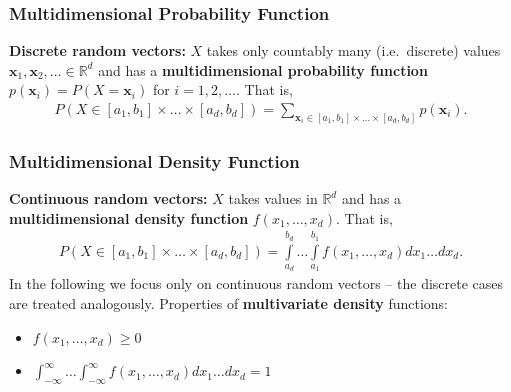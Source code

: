 \documentclass[
  letterpaper,
  DIV=11,
  numbers=noendperiod]{scrreprt}
\providecommand{\tightlist}{%
  \setlength{\itemsep}{0pt}\setlength{\parskip}{0pt}}\usepackage{longtable,booktabs,array}
\theoremstyle{definition}
\theoremstyle{plain}
\theoremstyle{plain}
\theoremstyle{remark}
\begin{document}
\hypertarget{multidimensional-probability-function}{%
\subsubsection{Multidimensional Probability
Function}\label{multidimensional-probability-function}}

\textbf{Discrete random vectors:} \(X\) takes only countably many
(i.e.~discrete) values
\(\mathbf{x}_1,\mathbf{x}_2,\dots\in\mathbb{R}^d\) and has a
\textbf{multidimensional probability function}
\(p(\mathbf{x}_i)=P(X=\mathbf{x}_i)\) for \(i=1,2,\dots\). That is,
\begin{align*}
P(X\in [a_1,b_1]\times\dots\times [a_d,b_d])=
\sum_{\mathbf{x}_i\in [a_1,b_1]\times\dots\times [a_d,b_d]}p(\mathbf{x}_i).
\end{align*}

\hypertarget{multidimensional-density-function}{%
\subsubsection{Multidimensional Density
Function}\label{multidimensional-density-function}}

\textbf{Continuous random vectors:} \(X\) takes values in
\(\mathbb{R}^d\) and has a \textbf{multidimensional density function}
\(f(x_1,\dots,x_d)\). That is, \begin{align*}
P(X\in [a_1,b_1]\times\dots\times [a_d,b_d])=\int\limits_{a_d}^{b_d}\dots \int\limits _{a_1}^{b_1}f(x_1,\dots,x_d)dx_1\dots dx_d.
\end{align*} In the following we focus only on continuous random vectors
-- the discrete cases are treated analogously. Properties of
\textbf{multivariate density} functions:

\begin{itemize}
\tightlist
\item
  \(\displaystyle f(x_1,\dots,x_d)\geq 0\)

  \par
\item
  \(\displaystyle \int_{-\infty}^{\infty}\dots \int_{-\infty}^{\infty}f(x_1,\dots,x_d)dx_1\dots dx_d=1\)
\end{itemize}
\end{document}
